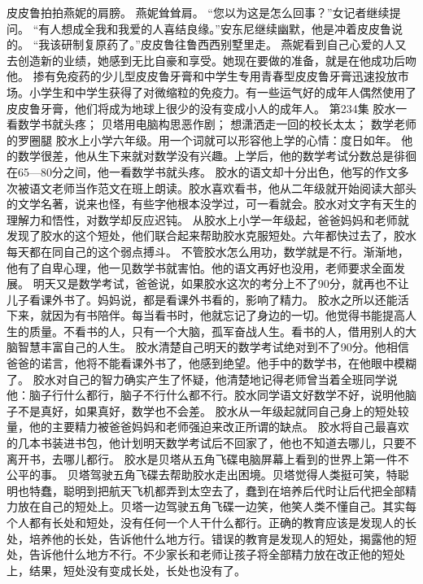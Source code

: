 \documentclass[a4paper,12pt,UTF8,twoside]{ctexbook}
\begin{document}
        皮皮鲁拍拍燕妮的肩膀。  
        燕妮耸耸肩。  
        “您以为这是怎么回事？”女记者继续提问。  
        “有人想成全我和我爱的人喜结良缘。”安东尼继续幽默，他是冲着皮皮鲁说的。  
        “我该研制复原药了。”皮皮鲁往鲁西西别墅里走。  
        燕妮看到自己心爱的人又去创造新的业绩，她感到无比自豪和享受。她现在要做的准备，就是在他成功后吻他。  
        掺有免疫药的少儿型皮皮鲁牙膏和中学生专用青春型皮皮鲁牙膏迅速投放市场。小学生和中学生获得了对微缩粒的免疫力。有一些运气好的成年人偶然使用了皮皮鲁牙膏，他们将成为地球上很少的没有变成小人的成年人。          第234集  
        胶水一看数学书就头疼；  
        贝塔用电脑构思恶作剧；  
        想潇洒走一回的校长太太；  
        数学老师的罗圈腿    
        胶水上小学六年级。用一个词就可以形容他上学的心情：度日如年。  
        他的数学很差，他从生下来就对数学没有兴趣。上学后，他的数学考试分数总是徘徊在65—80分之间，他一看数学书就头疼。  
        胶水的语文却十分出色，他写的作文多次被语文老师当作范文在班上朗读。胶水喜欢看书，他从二年级就开始阅读大部头的文学名著，说来也怪，有些字他根本没学过，可一看就会。胶水对文字有天生的理解力和悟性，对数学却反应迟钝。  
        从胶水上小学一年级起，爸爸妈妈和老师就发现了胶水的这个短处，他们联合起来帮助胶水克服短处。六年都快过去了，胶水每天都在同自己的这个弱点搏斗。  
        不管胶水怎么用功，数学就是不行。渐渐地，他有了自卑心理，他一见数学书就害怕。他的语文再好也没用，老师要求全面发展。  
        明天又是数学考试，爸爸说，如果胶水这次的考分上不了90分，就再也不让儿子看课外书了。妈妈说，都是看课外书看的，影响了精力。  
        胶水之所以还能活下来，就因为有书陪伴。每当看书时，他就忘记了身边的一切。他觉得书能提高人生的质量。不看书的人，只有一个大脑，孤军奋战人生。看书的人，借用别人的大脑智慧丰富自己的人生。  
        胶水清楚自己明天的数学考试绝对到不了90分。他相信爸爸的诺言，他将不能看课外书了，他感到绝望。他手中的数学书，在他眼中模糊了。  
        胶水对自己的智力确实产生了怀疑，他清楚地记得老师曾当着全班同学说他：脑子行什么都行，脑子不行什么都不行。胶水同学语文好数学不好，说明他脑子不是真好，如果真好，数学也不会差。  
        胶水从一年级起就同自己身上的短处较量，他的主要精力被爸爸妈妈和老师强迫来改正所谓的缺点。        
        胶水将自己最喜欢的几本书装进书包，他计划明天数学考试后不回家了，他也不知道去哪儿，只要不离开书，去哪儿都行。  
        胶水是贝塔从五角飞碟电脑屏幕上看到的世界上第一件不公平的事。  
        贝塔驾驶五角飞碟去帮助胶水走出困境。贝塔觉得人类挺可笑，特聪明也特蠢，聪明到把航天飞机都弄到太空去了，蠢到在培养后代时让后代把全部精力放在自己的短处上。贝塔一边驾驶五角飞碟一边笑，他笑人类不懂自己。其实每个人都有长处和短处，没有任何一个人干什么都行。正确的教育应该是发现人的长处，培养他的长处，告诉他什么地方行。错误的教育是发现人的短处，揭露他的短处，告诉他什么地方不行。不少家长和老师让孩子将全部精力放在改正他的短处上，结果，短处没有变成长处，长处也没有了。  
\end{document}
